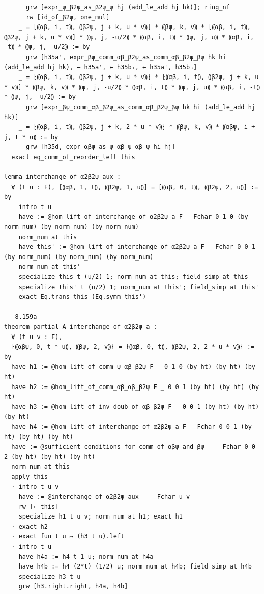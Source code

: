 \documentclass[10pt,a4paper]{article}
\begin{document}
\begin{Verbatim}
      grw [expr_ψ_β2ψ_as_β2ψ_ψ hj (add_le_add hj hk)]; ring_nf
      rw [id_of_β2ψ, one_mul]
    _ = ⁅⸨αβ, i, t⸩, ⸨β2ψ, j + k, u * v⸩⁆ * ⸨βψ, k, v⸩ * ⁅⸨αβ, i, t⸩, ⸨β2ψ, j + k, u * v⸩⁆ * ⸨ψ, j, -u/2⸩ * ⸨αβ, i, t⸩ * ⸨ψ, j, u⸩ * ⸨αβ, i, -t⸩ * ⸨ψ, j, -u/2⸩ := by
      grw [h35a', expr_βψ_comm_αβ_β2ψ_as_comm_αβ_β2ψ_βψ hk hi (add_le_add hj hk), ← h35a', ← h35b₁, ← h35a', h35b₃]
    _ = ⁅⸨αβ, i, t⸩, ⸨β2ψ, j + k, u * v⸩⁆ * ⁅⸨αβ, i, t⸩, ⸨β2ψ, j + k, u * v⸩⁆ * ⸨βψ, k, v⸩ * ⸨ψ, j, -u/2⸩ * ⸨αβ, i, t⸩ * ⸨ψ, j, u⸩ * ⸨αβ, i, -t⸩ * ⸨ψ, j, -u/2⸩ := by
      grw [expr_βψ_comm_αβ_β2ψ_as_comm_αβ_β2ψ_βψ hk hi (add_le_add hj hk)]
    _ = ⁅⸨αβ, i, t⸩, ⸨β2ψ, j + k, 2 * u * v⸩⁆ * ⸨βψ, k, v⸩ * ⸨αβψ, i + j, t * u⸩ := by
      grw [h35d, expr_αβψ_as_ψ_αβ_ψ_αβ_ψ hi hj]
  exact eq_comm_of_reorder_left this

lemma interchange_of_α2β2ψ_aux :
  ∀ (t u : F), ⁅⸨αβ, 1, t⸩, ⸨β2ψ, 1, u⸩⁆ = ⁅⸨αβ, 0, t⸩, ⸨β2ψ, 2, u⸩⁆ := by
    intro t u
    have := @hom_lift_of_interchange_of_α2β2ψ_a F _ Fchar 0 1 0 (by norm_num) (by norm_num) (by norm_num)
    norm_num at this
    have this' := @hom_lift_of_interchange_of_α2β2ψ_a F _ Fchar 0 0 1 (by norm_num) (by norm_num) (by norm_num)
    norm_num at this'
    specialize this t (u/2) 1; norm_num at this; field_simp at this
    specialize this' t (u/2) 1; norm_num at this'; field_simp at this'
    exact Eq.trans this (Eq.symm this')

-- 8.159a
theorem partial_A_interchange_of_α2β2ψ_a :
  ∀ (t u v : F),
  ⁅⸨αβψ, 0, t * u⸩, ⸨βψ, 2, v⸩⁆ = ⁅⸨αβ, 0, t⸩, ⸨β2ψ, 2, 2 * u * v⸩⁆ := by
  have h1 := @hom_lift_of_comm_ψ_αβ_β2ψ F _ 0 1 0 (by ht) (by ht) (by ht)
  have h2 := @hom_lift_of_comm_αβ_αβ_β2ψ F _ 0 0 1 (by ht) (by ht) (by ht)
  have h3 := @hom_lift_of_inv_doub_of_αβ_β2ψ F _ 0 0 1 (by ht) (by ht) (by ht)
  have h4 := @hom_lift_of_interchange_of_α2β2ψ_a F _ Fchar 0 0 1 (by ht) (by ht) (by ht)
  have := @sufficient_conditions_for_comm_of_αβψ_and_βψ _ _ Fchar 0 0 2 (by ht) (by ht) (by ht)
  norm_num at this
  apply this
  · intro t u v
    have := @interchange_of_α2β2ψ_aux _ _ Fchar u v
    rw [← this]
    specialize h1 t u v; norm_num at h1; exact h1
  · exact h2
  · exact fun t u ↦ (h3 t u).left
  · intro t u
    have h4a := h4 t 1 u; norm_num at h4a
    have h4b := h4 (2*t) (1/2) u; norm_num at h4b; field_simp at h4b
    specialize h3 t u
    grw [h3.right.right, h4a, h4b]


\end{Verbatim}
\end{document}
